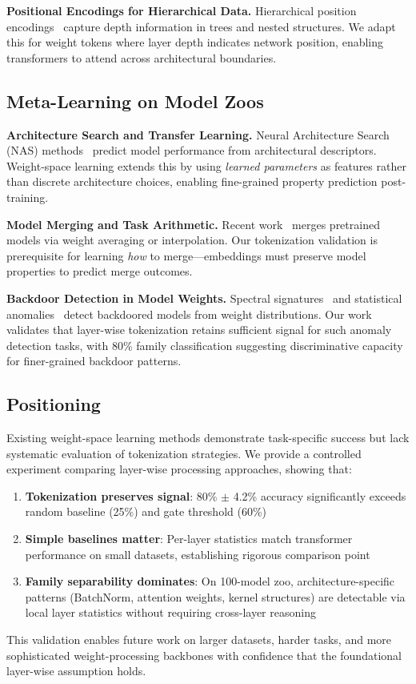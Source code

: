 \textbf{Positional Encodings for Hierarchical Data.} Hierarchical position encodings~\cite{shaw2018self} capture depth information in trees and nested structures. We adapt this for weight tokens where layer depth indicates network position, enabling transformers to attend across architectural boundaries.

\subsection{Meta-Learning on Model Zoos}

\textbf{Architecture Search and Transfer Learning.} Neural Architecture Search (NAS) methods~\cite{zoph2017neural} predict model performance from architectural descriptors. Weight-space learning extends this by using \textit{learned parameters} as features rather than discrete architecture choices, enabling fine-grained property prediction post-training.

\textbf{Model Merging and Task Arithmetic.} Recent work~\cite{wortsman2022model,ilharco2023editing} merges pretrained models via weight averaging or interpolation. Our tokenization validation is prerequisite for learning \textit{how} to merge---embeddings must preserve model properties to predict merge outcomes.

\textbf{Backdoor Detection in Model Weights.} Spectral signatures~\cite{wang2019neural} and statistical anomalies~\cite{tran2018spectral} detect backdoored models from weight distributions. Our work validates that layer-wise tokenization retains sufficient signal for such anomaly detection tasks, with 80\% family classification suggesting discriminative capacity for finer-grained backdoor patterns.

\subsection{Positioning}

Existing weight-space learning methods demonstrate task-specific success but lack systematic evaluation of tokenization strategies. We provide a controlled experiment comparing layer-wise processing approaches, showing that:

\begin{enumerate}
\item \textbf{Tokenization preserves signal}: 80\% $\pm$ 4.2\% accuracy significantly exceeds random baseline (25\%) and gate threshold (60\%)
\item \textbf{Simple baselines matter}: Per-layer statistics match transformer performance on small datasets, establishing rigorous comparison point
\item \textbf{Family separability dominates}: On 100-model zoo, architecture-specific patterns (BatchNorm, attention weights, kernel structures) are detectable via local layer statistics without requiring cross-layer reasoning
\end{enumerate}

This validation enables future work on larger datasets, harder tasks, and more sophisticated weight-processing backbones with confidence that the foundational layer-wise assumption holds.
